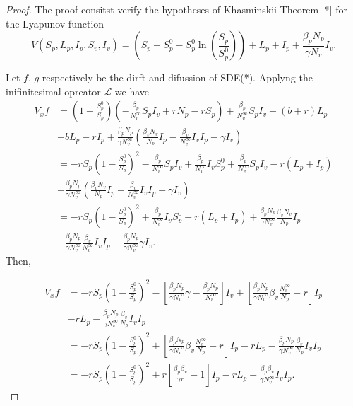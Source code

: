 \begin{proof}
	The proof consitst verify the hypotheses of Khasminskii Theorem [*] for the Lyapunov 
	function 	
	\begin{equation}
		\label{eq4}
		V(S_p,L_p,I_p,S_v,I_v) = 
			\left (
				S_p - S_p^0 - S_p^0
				\ln
				\left(
					\frac{S_p}{S_p^0}
				\right)
			\right) + 
			L_p + 
			I_p +
			\frac{\beta_p N_p}{\gamma N_v} I_v .
	\end{equation}

	Let $f$, $g$ respectively be the dirft and difussion of SDE(*).
	Applyng the inifinitesimal opreator $\mathcal{L}$ we have
	\begin{align*}
		V_x f &=
			\left(
				1 - \frac{S_p^0}{S_p}
			\right)
			\left(
				-\frac{\beta_p}{N^\infty_v}
				S_pI_v + rN_p - r S_p
			\right) + 
			\frac{\beta_p}{N^\infty_v} S_p I_v - 
			(b + r) L_p
			\\
			& +
				b L_p - rI_p + 
				\frac{ \beta_p N_p}{\gamma N ^ \infty_v}
				\left(
					\frac{\beta_v N_v}{N_p}I_p - 
					\frac{\beta_v}{N_v ^ \infty} I_vI_p - 
					\gamma I_v\right
				)
			\\
			& =
				-rS_p 
				\left(
					1 - \frac{S_p^0}{S_p}
				\right) ^ 2 -
				\frac{\beta_p}{N_v ^ \infty} S_pI_v +
				\frac{\beta_p}{N_v ^ \infty} I_vS_p ^ 0 + 
				\frac{\beta_p}{N_v ^ \infty} S_pI_v -
				r(L_p + I_p)
			\\
			& +
			  	\frac{\beta_p N_p}{\gamma N ^ \infty _ v}
			  	\left(
			  		\frac{\beta_v N_v}{N_p}I_p - 
			  		\frac{\beta_v}{N_v ^ \infty} I_v I_p - 
			  		\gamma I_v
			  	\right)
			\\
			&=
				-r S_p
				\left(
					1 - \frac{S_p^0}{S_p}
				\right) ^ 2 + 
				\frac{\beta_p}{N_v ^ \infty} I_v S_p ^ 0 - 
				r (L_p + I_p) + 
				\frac{\beta_p N_p}{\gamma N ^ \infty_v}
				\frac{\beta_v N_v}{N_p}I_p
			\\
			  &-	
			  	\frac{\beta_p N_p}{\gamma N ^ \infty_v}
			  	\frac{\beta_v}{N_v ^ \infty} I_v I_p -
			  	\frac{\beta_p N_p}{\gamma N ^ \infty_v} \gamma I_v.
	\end{align*}
		Then,
	
	\begin{align*}
		V_x f &=
				-rS_p\left(1-\frac{S_p^0}{S_p}\right)^2-\left[\frac{\beta_p N_p}{\gamma N^\infty_v}\gamma-\frac{\beta_p N_p}{N_v^\infty}\right]I_v+\left[\frac{\beta_p N_p}{\gamma N^\infty_v}\beta_v\frac{N_v^\infty}{N_p}-r\right]I_p\\
		 	  &-
				rL_p-\frac{\beta_p N_p}{\gamma N^\infty_v}\frac{\beta_v}{N_p}I_vI_p\\
			  &=
			  	-rS_p\left(1-\frac{S_p^0}{S_p}\right)^2 + \left[\frac{\beta_p N_p}{\gamma N^\infty_v}\beta_v\frac{N_v^\infty}{N_p}-r\right]I_p-rL_p-\frac{\beta_p N_p}{\gamma N^\infty_v}\frac{\beta_v}{N_p}I_vI_p\\
			  &=
			  	-rS_p\left(1-\frac{S_p^0}{S_p}\right)^2 + r\left[\frac{\beta_p\beta_v}{\gamma r}-1\right]I_p-rL_p-\frac{\beta_p\beta_v}{\gamma N^\infty_v}I_vI_p.
	\end{align*}
	

\end{proof}
